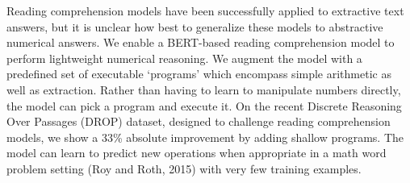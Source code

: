 Reading comprehension models have been successfully applied to extractive text answers, but it is unclear how best to generalize these models to abstractive numerical answers. We enable a BERT-based reading comprehension model to perform lightweight numerical reasoning. We augment the model with a predefined set of executable `programs' which encompass simple arithmetic as well as extraction. Rather than having to learn to manipulate numbers directly, the model can pick a program and execute it. On the recent Discrete Reasoning Over Passages (DROP) dataset, designed to challenge reading comprehension models, we show a  33\% absolute improvement by adding shallow programs. The model can learn to predict new operations when appropriate in a math word problem setting (Roy and Roth, 2015) with very few training examples.